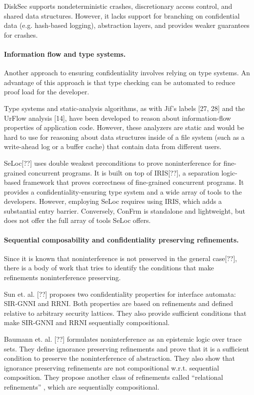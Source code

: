 DiskSec supports nondeterministic crashes, discretionary access control, and shared data structures. However, it lacks support for branching on confidential data (e.g. hash-based logging), abstraction layers, and provides weaker guarantees for crashes.

\paragraph{Information flow and type systems.} 
Another approach to ensuring confidentiality involves relying on type systems. An advantage of this approach is that type checking can be automated to reduce proof load for the developer. 


Type systems and static-analysis algorithms, as with Jif’s labels [27, 28] and the UrFlow analysis [14], have been developed to reason about information-flow properties of application code. However, these analyzers are static and would be hard to use for reasoning about data structures inside of a file system (such as a write-ahead log or a buffer cache) that contain data from different users.

SeLoc[??] uses double weakest preconditions to prove noninterference for fine-grained concurrent programs. It is built on top of IRIS[??], a separation logic-based framework that proves correctness of fine-grained concurrent programs. It provides a confidentiality-ensuring type system and a wide array of tools to the developers. However, employing SeLoc requires using IRIS, which adds a substantial entry barrier. Conversely, ConFrm is standalone and lightweight, but does not offer the full array of tools SeLoc offers. 

\paragraph{Sequential composability and confidentiality preserving refinements.} 
Since it is known that noninterference is not preserved in the general case[??], there is a body of work that tries to identify the conditions that make refinements noninterference preserving. 

 
Sun et. al. [??] proposes two confidentiality properties for interface automata: SIR-GNNI and RRNI. Both properties are based on refinements and defined relative to arbitrary security lattices. They also provide sufficient conditions that make SIR-GNNI and RRNI sequentially compositional. 

Baumann et. al. [??] formulates noninterference as an epistemic logic over trace sets. They define ignorance preserving refinements and prove that it is a sufficient condition to preserve the noninterference of abstraction. They also show that ignorance preserving refinements are not compositional w.r.t. sequential composition. They propose another class of refinements called “relational refinements” , which are sequentially compositional. 


